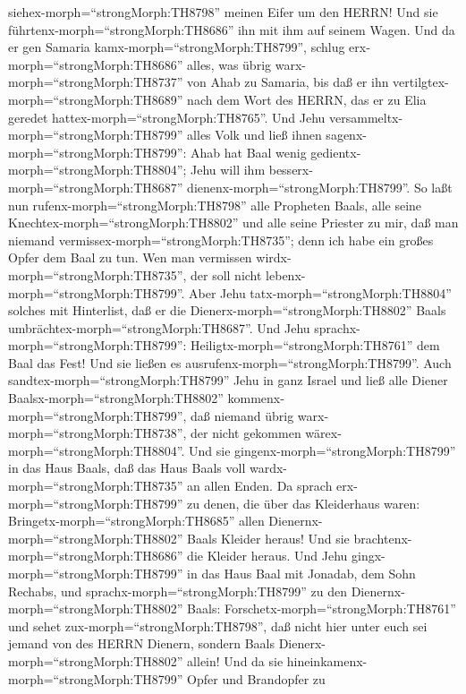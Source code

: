 siehex-morph=``strongMorph:TH8798'' meinen Eifer um den HERRN! Und sie
führtenx-morph=``strongMorph:TH8686'' ihn mit ihm auf seinem Wagen.
 Und da er gen Samaria kamx-morph=``strongMorph:TH8799'',
schlug erx-morph=``strongMorph:TH8686'' alles, was übrig
warx-morph=``strongMorph:TH8737'' von Ahab zu Samaria, bis daß er ihn
vertilgtex-morph=``strongMorph:TH8689'' nach dem Wort des HERRN, das er
zu Elia geredet hattex-morph=``strongMorph:TH8765''.  Und
Jehu versammeltx-morph=``strongMorph:TH8799'' alles Volk und ließ ihnen
sagenx-morph=``strongMorph:TH8799'': Ahab hat Baal wenig
gedientx-morph=``strongMorph:TH8804''; Jehu will ihm
besserx-morph=``strongMorph:TH8687''
dienenx-morph=``strongMorph:TH8799''.  So laßt nun
rufenx-morph=``strongMorph:TH8798'' alle Propheten Baals, alle seine
Knechtex-morph=``strongMorph:TH8802'' und alle seine Priester zu mir,
daß man niemand vermissex-morph=``strongMorph:TH8735''; denn ich habe
ein großes Opfer dem Baal zu tun. Wen man vermissen
wirdx-morph=``strongMorph:TH8735'', der soll nicht
lebenx-morph=``strongMorph:TH8799''. Aber Jehu
tatx-morph=``strongMorph:TH8804'' solches mit Hinterlist, daß er die
Dienerx-morph=``strongMorph:TH8802'' Baals
umbrächtex-morph=``strongMorph:TH8687''.  Und Jehu
sprachx-morph=``strongMorph:TH8799'':
Heiligtx-morph=``strongMorph:TH8761'' dem Baal das Fest! Und sie ließen
es ausrufenx-morph=``strongMorph:TH8799''.  Auch
sandtex-morph=``strongMorph:TH8799'' Jehu in ganz Israel und ließ alle
Diener Baalsx-morph=``strongMorph:TH8802''
kommenx-morph=``strongMorph:TH8799'', daß niemand übrig
warx-morph=``strongMorph:TH8738'', der nicht gekommen
wärex-morph=``strongMorph:TH8804''. Und sie
gingenx-morph=``strongMorph:TH8799'' in das Haus Baals, daß das Haus
Baals voll wardx-morph=``strongMorph:TH8735'' an allen Enden.
 Da sprach erx-morph=``strongMorph:TH8799'' zu denen, die
über das Kleiderhaus waren: Bringetx-morph=``strongMorph:TH8685'' allen
Dienernx-morph=``strongMorph:TH8802'' Baals Kleider heraus! Und sie
brachtenx-morph=``strongMorph:TH8686'' die Kleider heraus. 
Und Jehu gingx-morph=``strongMorph:TH8799'' in das Haus Baal mit
Jonadab, dem Sohn Rechabs, und sprachx-morph=``strongMorph:TH8799'' zu
den Dienernx-morph=``strongMorph:TH8802'' Baals:
Forschetx-morph=``strongMorph:TH8761'' und sehet
zux-morph=``strongMorph:TH8798'', daß nicht hier unter euch sei jemand
von des HERRN Dienern, sondern Baals
Dienerx-morph=``strongMorph:TH8802'' allein!  Und da sie
hineinkamenx-morph=``strongMorph:TH8799'' Opfer und Brandopfer zu
